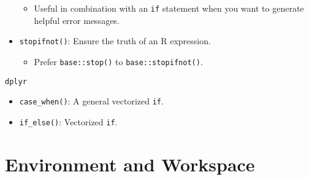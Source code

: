 \documentclass[
]{book}
\providecommand{\tightlist}{%
  \setlength{\itemsep}{0pt}\setlength{\parskip}{0pt}}
\begin{document}
\begin{itemize}
  \begin{itemize}
  \tightlist
  \item
    Useful in combination with an \texttt{if} statement when you want to generate helpful error messages.
  \end{itemize}
\item
  \texttt{stopifnot()}: Ensure the truth of an R expression.

  \begin{itemize}
  \tightlist
  \item
    Prefer \texttt{base::stop()} to \texttt{base::stopifnot()}.
  \end{itemize}
\end{itemize}

\texttt{dplyr}

\begin{itemize}
\tightlist
\item
  \texttt{case\_when()}: A general vectorized \texttt{if}.
\item
  \texttt{if\_else()}: Vectorized \texttt{if}.
\end{itemize}

\hypertarget{environment-and-workspace}{%
\section{Environment and Workspace}\label{environment-and-workspace}}
\end{document}

